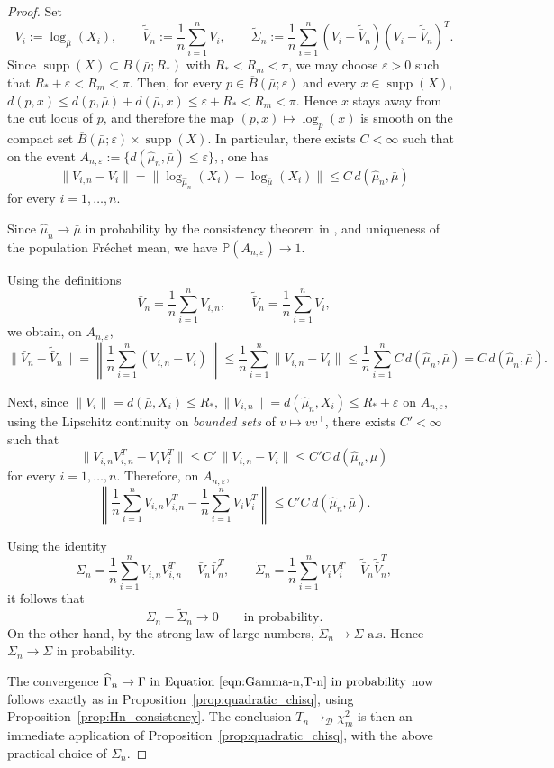 \documentclass{amsart}
\theoremstyle{definition}
\theoremstyle{remark}
\newcommand{\nd}{\noindent}
\newcommand{\mubar}{\bar{\mu}}
\newcommand\0{\boldsymbol{0}}
\begin{document}
\begin{proof}
Set
\[
V_i:=\log_{\bar{\mu}}(X_i),
\qquad
\widetilde{\bar V}_n:=\frac1n\sum_{i=1}^n V_i,
\qquad
\widetilde\Sigma_n:=\frac1n\sum_{i=1}^n (V_i-\widetilde{\bar V}_n)(V_i-\widetilde{\bar V}_n)^T.
\]
Since $\operatorname{supp}(X)\subset \overline B(\bar{\mu};R_\ast)$ with $R_\ast<R_m<\pi$, we may choose $\varepsilon>0$ such that
\(
R_\ast+\varepsilon<R_m <\pi.
\)
Then, for every $p\in \overline B(\bar{\mu};\varepsilon)$ and every $x\in \operatorname{supp}(X)$,
\(
d(p,x)\le d(p,\bar{\mu})+d(\bar{\mu},x)\le \varepsilon+R_\ast< R_m < \pi.
\)
Hence $x$ stays away from the cut locus of $p$, and therefore the map
\(
(p,x)\mapsto \log_p(x)
\)
is smooth on the compact set
\(
\overline B(\bar{\mu};\varepsilon)\times \operatorname{supp}(X).
\)
In particular, there exists $C<\infty$ such that on the event
\(
A_{n,\varepsilon}:=\{d(\hat{\mu}_n,\bar{\mu})\le \varepsilon\},
\),
one has
\[
\|V_{i,n}-V_i\|
=
\|\log_{\hat{\mu}_n}(X_i)-\log_{\bar{\mu}}(X_i)\|
\le C\,d(\hat{\mu}_n,\bar{\mu})
\]
for every $i=1,\dots,n$.

Since $\hat{\mu}_n\to\bar{\mu}$ in probability by the consistency theorem in \citet{Ziezold1977}, and uniqueness of the population Fréchet mean, we have
\(
\mathbb P(A_{n,\varepsilon})\to 1.
\)

Using the definitions
\[
\bar V_n=\frac1n\sum_{i=1}^n V_{i,n},
\qquad
\widetilde{\bar V}_n=\frac1n\sum_{i=1}^n V_i,
\]
we obtain, on $A_{n,\varepsilon}$,
\[
\|\bar V_n-\widetilde{\bar V}_n\|
=
\left\|\frac1n\sum_{i=1}^n (V_{i,n}-V_i)\right\|
\le
\frac1n\sum_{i=1}^n \|V_{i,n}-V_i\|
\le
\frac1n\sum_{i=1}^n C\,d(\hat{\mu}_n,\bar{\mu})
=
C\,d(\hat{\mu}_n,\bar{\mu}).
\]

\nd Next, since
\(
\|V_i\| = d(\mubar, X_i)\le R_\ast,
\|V_{i,n}\| = d(\hat{\mu}_n, X_i)\le R_\ast+\varepsilon
\)
on $A_{n,\varepsilon}$, using the Lipschitz continuity on \textit{bounded sets} of $v\mapsto vv^{\top}$, there exists $C'<\infty$ such that
\[
\|V_{i,n}V_{i,n}^T-V_iV_i^T\|
\le C'\,\|V_{i,n}-V_i\|
\le C'C\,d(\hat{\mu}_n,\bar{\mu})
\]
for every $i=1,\dots,n$. Therefore, on $A_{n,\varepsilon}$,
\[
\left\|
\frac1n\sum_{i=1}^n V_{i,n}V_{i,n}^T
-
\frac1n\sum_{i=1}^n V_iV_i^T
\right\|
\le C'C\,d(\hat{\mu}_n,\bar{\mu}).
\]

\nd Using the identity
\[
\Sigma_n=
\frac1n\sum_{i=1}^n V_{i,n}V_{i,n}^T-\bar V_n\bar V_n^T,
\qquad
\widetilde\Sigma_n=
\frac1n\sum_{i=1}^n V_iV_i^T-\widetilde{\bar V}_n\widetilde{\bar V}_n^T,
\]
it follows that
\[
\Sigma_n-\widetilde\Sigma_n\to 0
\qquad\text{in probability}.
\]
On the other hand, by the strong law of large numbers,
\(
\widetilde\Sigma_n\to \Sigma
\text{ a.s.}
\)
Hence
\(
\Sigma_n\to\Sigma
\text{ in probability}.
\)

\nd The convergence
\(
\widehat\Gamma_n\to\Gamma \text{ in Equation } \eqref{eqn:Gamma-n,T-n}
\text{ in probability}
\)
now follows exactly as in Proposition~\ref{prop:quadratic_chisq}, using Proposition~\ref{prop:Hn_consistency}. The conclusion
\(
T_n\rightarrow_{\mathcal D}\chi_m^2
\)
is then an immediate application of Proposition~\ref{prop:quadratic_chisq}, with the above practical choice of $\Sigma_n$.
\end{proof}
\end{document}
